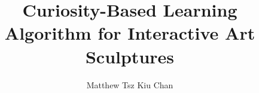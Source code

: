 \documentclass[letterpaper, 12pt]{report}
\title{Curiosity-Based Learning Algorithm for Interactive Art Sculptures}
\author{Matthew Tsz Kiu Chan}
\begin{document}
\maketitle

\begin{abstract}
\end{abstract}
\end{document}
